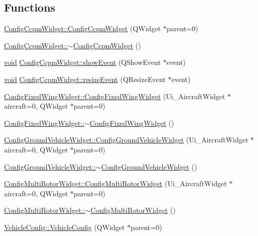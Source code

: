 \subsection*{Functions}
\begin{DoxyCompactItemize}
\item 
\hyperlink{group___config_plugin_gad02f1999c6fe879b07303698416ff782}{Config\-Ccpm\-Widget\-::\-Config\-Ccpm\-Widget} (Q\-Widget $\ast$parent=0)
\item 
\hyperlink{group___config_plugin_ga1c115c3e78572da9895bc485b6ed507e}{Config\-Ccpm\-Widget\-::$\sim$\-Config\-Ccpm\-Widget} ()
\item 
\hyperlink{group___u_a_v_objects_plugin_ga444cf2ff3f0ecbe028adce838d373f5c}{void} \hyperlink{group___config_plugin_ga400903af96a9e0b31101d06356f267fe}{Config\-Ccpm\-Widget\-::show\-Event} (Q\-Show\-Event $\ast$event)
\item 
\hyperlink{group___u_a_v_objects_plugin_ga444cf2ff3f0ecbe028adce838d373f5c}{void} \hyperlink{group___config_plugin_gaa76c187cd732f13b15ee909af137487f}{Config\-Ccpm\-Widget\-::resize\-Event} (Q\-Resize\-Event $\ast$event)
\item 
\hyperlink{group___config_plugin_gaee3501121903de9f9860f69611fd07e6}{Config\-Fixed\-Wing\-Widget\-::\-Config\-Fixed\-Wing\-Widget} (Ui\-\_\-\-Aircraft\-Widget $\ast$aircraft=0, Q\-Widget $\ast$parent=0)
\item 
\hyperlink{group___config_plugin_ga9f0af233f9470bbaab33d70b96644cef}{Config\-Fixed\-Wing\-Widget\-::$\sim$\-Config\-Fixed\-Wing\-Widget} ()
\item 
\hyperlink{group___config_plugin_ga7d15969655ebd8ccde81977fd63cc516}{Config\-Ground\-Vehicle\-Widget\-::\-Config\-Ground\-Vehicle\-Widget} (Ui\-\_\-\-Aircraft\-Widget $\ast$aircraft=0, Q\-Widget $\ast$parent=0)
\item 
\hyperlink{group___config_plugin_ga9104e5fbab423b4e0f0b1f7bc92b4a87}{Config\-Ground\-Vehicle\-Widget\-::$\sim$\-Config\-Ground\-Vehicle\-Widget} ()
\item 
\hyperlink{group___config_plugin_ga1f8b823890ddd40ac391df9aa59cfd79}{Config\-Multi\-Rotor\-Widget\-::\-Config\-Multi\-Rotor\-Widget} (Ui\-\_\-\-Aircraft\-Widget $\ast$aircraft=0, Q\-Widget $\ast$parent=0)
\item 
\hyperlink{group___config_plugin_gac8ee6c628cb4f8f195395978f8f086bb}{Config\-Multi\-Rotor\-Widget\-::$\sim$\-Config\-Multi\-Rotor\-Widget} ()
\item 
\hyperlink{group___config_plugin_ga369dba1a2bcda89963b25078cbf89fd9}{Vehicle\-Config\-::\-Vehicle\-Config} (Q\-Widget $\ast$parent=0)

\end{DoxyCompactItemize}
